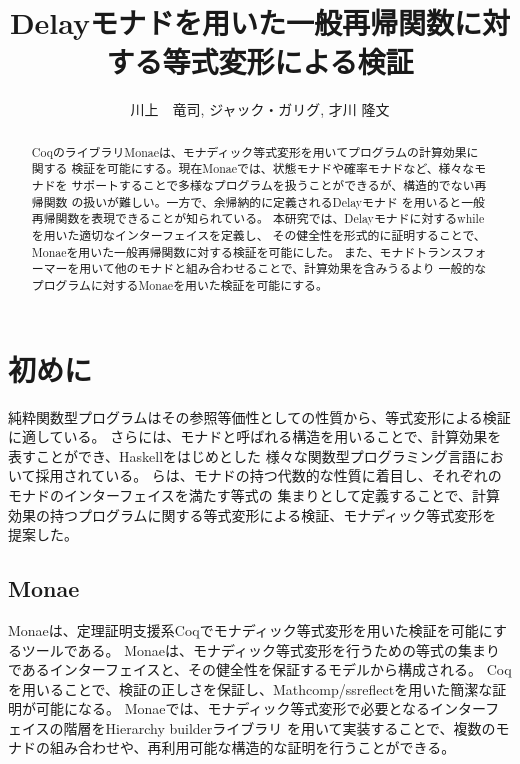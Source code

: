 \documentclass[japanese]{jssst_ppl}
\title{Delayモナドを用いた一般再帰関数に対する等式変形による検証}
\author{川上　竜司, ジャック・ガリグ, 才川 隆文}
\theoremstyle{definition}
\begin{document}
\maketitle
\begin{abstract}
  CoqのライブラリMonaeは、モナディック等式変形を用いてプログラムの計算効果に関する
  検証を可能にする。現在Monaeでは、状態モナドや確率モナドなど、様々なモナドを
  サポートすることで多様なプログラムを扱うことができるが、構造的でない再帰関数
  の扱いが難しい。一方で、余帰納的に定義されるDelayモナド
  を用いると一般再帰関数を表現できることが知られている。
  本研究では、Delayモナドに対するwhileを用いた適切なインターフェイスを定義し、
  その健全性を形式的に証明することで、Monaeを用いた一般再帰関数に対する検証を可能にした。
  また、モナドトランスフォーマーを用いて他のモナドと組み合わせることで、計算効果を含みうるより
  一般的なプログラムに対するMonaeを用いた検証を可能にする。
\end{abstract}

\section{初めに}
純粋関数型プログラムはその参照等価性としての性質から、等式変形による検証に適している。
さらには、モナドと呼ばれる構造を用いることで、計算効果を表すことができ、Haskellをはじめとした
様々な関数型プログラミング言語において採用されている。
\cite{ddd}らは、モナドの持つ代数的な性質に着目し、それぞれのモナドのインターフェイスを満たす等式の
集まりとして定義することで、計算効果の持つプログラムに関する等式変形による検証、モナディック等式変形を
提案した。

\subsection{Monae}
Monae\cite{ddd}は、定理証明支援系Coqでモナディック等式変形を用いた検証を可能にするツールである。
Monaeは、モナディック等式変形を行うための等式の集まりであるインターフェイスと、その健全性を保証するモデルから構成される。
Coqを用いることで、検証の正しさを保証し、Mathcomp/ssreflectを用いた簡潔な証明が可能になる。
Monaeでは、モナディック等式変形で必要となるインターフェイスの階層をHierarchy builderライブラリ\cite{ddd}
を用いて実装することで、複数のモナドの組み合わせや、再利用可能な構造的な証明を行うことができる。
\end{document}

